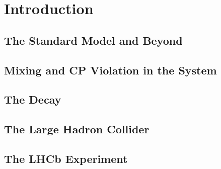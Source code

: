 \chapter{Introduction}


\section{The Standard Model and Beyond}
\section{Mixing and CP Violation in the \BsBsbar{} System}
\section{The \BstoJpsiphi{} Decay}
\section{The Large Hadron Collider}
\section{The LHCb Experiment}
